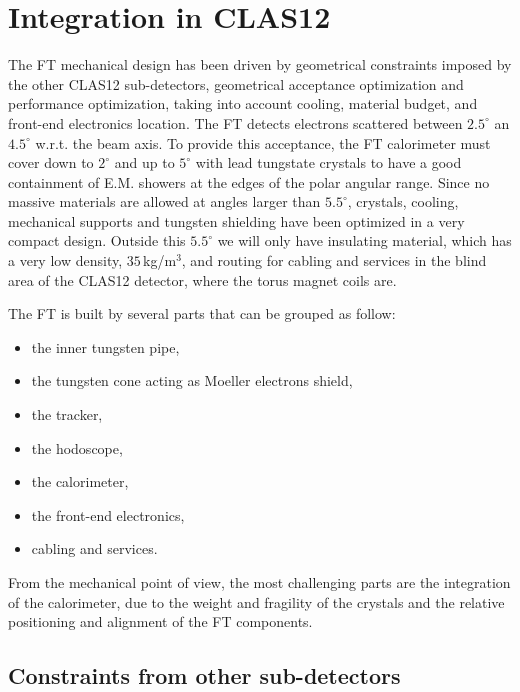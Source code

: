 \section{Integration in CLAS12}\label{sec:integration}
The FT mechanical design  has been driven by geometrical constraints imposed by the other CLAS12 sub-detectors, geometrical acceptance optimization and performance optimization, taking into account cooling, material budget, and front-end electronics location.
The FT detects electrons scattered between $2.5^\circ$ an $4.5^\circ$ w.r.t. the beam axis. To provide this acceptance, the FT calorimeter must cover down to $2^\circ$ and up to $5^\circ$ with lead tungstate crystals to have a good containment of E.M. showers at the edges of the polar angular range. Since no massive materials are allowed at angles larger than $5.5^\circ$, crystals, cooling, mechanical supports and tungsten shielding have been optimized in a very compact design. Outside this $5.5^\circ$ we will only have insulating material, which has a very low density, $35\,$kg/m$^3$, and routing for cabling and services in the blind area of the CLAS12 detector, where the torus magnet coils are.

The FT is built by several parts that can be grouped as follow:

\begin{itemize}
\item{the inner tungsten pipe,}
\item{the tungsten cone acting as Moeller electrons shield,}
\item{the tracker,}
\item{the hodoscope,}
\item{the calorimeter,}
\item{the front-end electronics,}
\item{cabling and services.}
\end{itemize}

From the mechanical point of view, the most challenging parts are the integration of the calorimeter, due to the weight and fragility of the crystals and the relative positioning and alignment of the FT components.


\subsection{Constraints from other sub-detectors}

